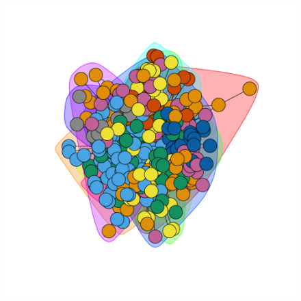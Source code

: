 \documentclass{article}
\begin{document}
\begin{figure}[htbp]
{\begin{minipage}[b]{0.4\textwidth}
\includegraphics[width=1\textwidth]{sub_com_5.png}
\end{minipage}
}
\end{figure}
\end{document}
